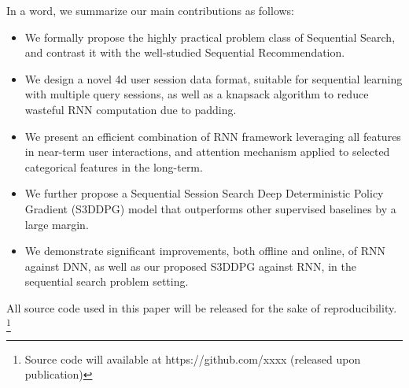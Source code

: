 
In a word, we summarize our main contributions as follows:
\begin{itemize}
    \item We formally propose the highly practical problem class of Sequential Search, and contrast it with the well-studied Sequential Recommendation.
    \item We design a novel 4d user session data format, suitable for sequential learning with multiple query sessions, as well as a knapsack algorithm to reduce wasteful RNN computation due to padding.
    \item We present an efficient combination of RNN framework leveraging all features in near-term user interactions, and attention mechanism applied to selected categorical features in the long-term.
    \item We further propose a Sequential Session Search Deep Deterministic Policy Gradient (S3DDPG) model that outperforms other supervised baselines by a large margin.
    \item We demonstrate significant improvements, both offline and online, of RNN against DNN, as well as our proposed S3DDPG against RNN, in the sequential search problem setting.
\end{itemize}


All source code used in this paper will be released for the sake of reproducibility. 
\footnote{Source code will available at https://github.com/xxxx (released upon publication)}
